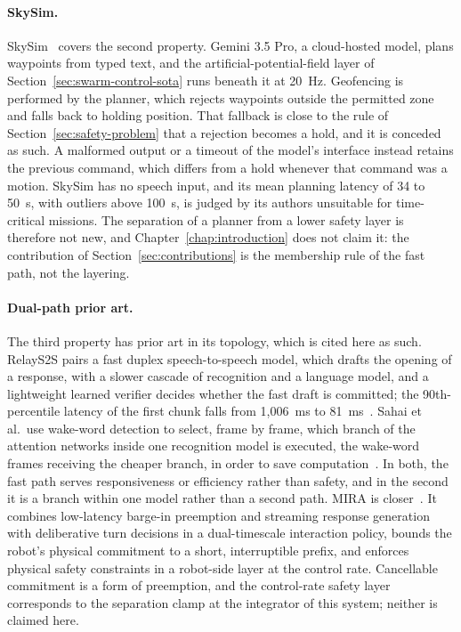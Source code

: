 \paragraph{SkySim.} SkySim~\cite{skysim2026} covers the second property. Gemini 3.5 Pro, a
cloud-hosted model, plans waypoints from typed text, and the artificial-potential-field layer of
Section~\ref{sec:swarm-control-sota} runs beneath it at 20~Hz. Geofencing is performed by the
planner, which rejects waypoints outside the permitted zone and falls back to holding position. That
fallback is close to the rule of Section~\ref{sec:safety-problem} that a rejection becomes a hold,
and it is conceded as such. A malformed output or a timeout of the model's interface instead
retains the previous command, which differs from a hold whenever that command was a motion. SkySim
has no speech input, and its mean planning latency of 34 to 50~s, with outliers above 100~s, is
judged by its authors unsuitable for time-critical missions. The separation of a planner from a
lower safety layer is therefore not new, and Chapter~\ref{chap:introduction} does not claim it: the
contribution of Section~\ref{sec:contributions} is the membership rule of the fast path, not the
layering.

\paragraph{Dual-path prior art.} The third property has prior art in its topology, which is cited
here as such. RelayS2S pairs a fast duplex speech-to-speech model, which drafts the opening of a
response, with a slower cascade of recognition and a language model, and a lightweight learned
verifier decides whether the fast draft is committed; the 90th-percentile latency of the first
chunk falls from 1{,}006~ms to 81~ms~\cite{relays2s}. Sahai et al.\ use wake-word detection to
select, frame by frame, which branch of the attention networks inside one recognition model is
executed, the wake-word frames receiving the cheaper branch, in order to save
computation~\cite{dualattn2023}. In both, the fast path serves responsiveness or efficiency rather
than safety, and in the second it is a branch within one model rather than a second path. MIRA is
closer~\cite{mira}. It combines low-latency barge-in preemption and streaming response generation
with deliberative turn decisions in a dual-timescale interaction policy, bounds the robot's physical
commitment to a short, interruptible prefix, and enforces physical safety constraints in a
robot-side layer at the control rate. Cancellable commitment is a form of preemption, and the
control-rate safety layer corresponds to the separation clamp at the integrator of this system;
neither is claimed here.

